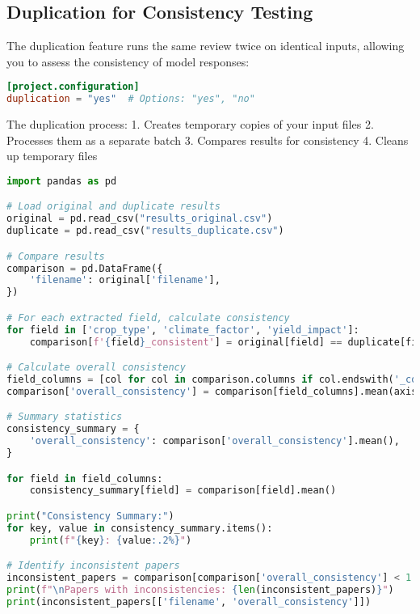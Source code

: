 \subsection{Duplication for Consistency Testing}

The duplication feature runs the same review twice on identical inputs, allowing you to assess the consistency of model responses:

\begin{configbox}
\begin{lstlisting}[language=TOML]
[project.configuration]
duplication = "yes"  # Options: "yes", "no"
\end{lstlisting}
\end{configbox}


The duplication process:
1. Creates temporary copies of your input files
2. Processes them as a separate batch
3. Compares results for consistency
4. Cleans up temporary files

\begin{commandbox}
\begin{lstlisting}[language=Python]
import pandas as pd

# Load original and duplicate results
original = pd.read_csv("results_original.csv")
duplicate = pd.read_csv("results_duplicate.csv")

# Compare results
comparison = pd.DataFrame({
    'filename': original['filename'],
})

# For each extracted field, calculate consistency
for field in ['crop_type', 'climate_factor', 'yield_impact']:
    comparison[f'{field}_consistent'] = original[field] == duplicate[field]

# Calculate overall consistency
field_columns = [col for col in comparison.columns if col.endswith('_consistent')]
comparison['overall_consistency'] = comparison[field_columns].mean(axis=1)

# Summary statistics
consistency_summary = {
    'overall_consistency': comparison['overall_consistency'].mean(),
}

for field in field_columns:
    consistency_summary[field] = comparison[field].mean()

print("Consistency Summary:")
for key, value in consistency_summary.items():
    print(f"{key}: {value:.2%}")

# Identify inconsistent papers
inconsistent_papers = comparison[comparison['overall_consistency'] < 1.0]
print(f"\nPapers with inconsistencies: {len(inconsistent_papers)}")
print(inconsistent_papers[['filename', 'overall_consistency']])
\end{lstlisting}
\end{commandbox}


